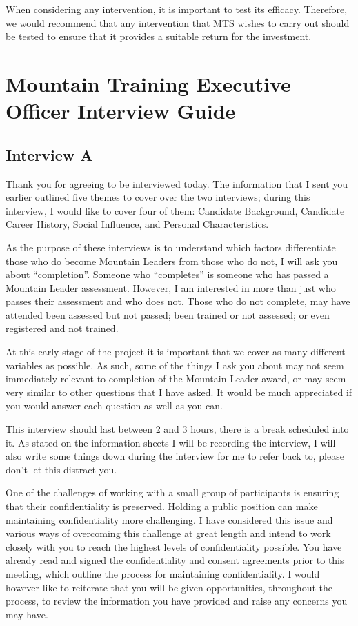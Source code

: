 \documentclass[
  12pt,
  a4paper,
]{book}
\begin{document}
When considering any intervention, it is important to test its efficacy. Therefore, we would recommend that any intervention that MTS wishes to carry out should be tested to ensure that it provides a suitable return for the investment.

\hypertarget{appendix-appendix}{%
\appendix}


\hypertarget{appendix-interview-guide}{%
\chapter{Mountain Training Executive Officer Interview Guide}\label{appendix-interview-guide}}

\hypertarget{interview-a}{%
\section{Interview A}\label{interview-a}}

Thank you for agreeing to be interviewed today. The information that I sent you earlier outlined five themes to cover over the two interviews; during this interview, I would like to cover four of them: Candidate Background, Candidate Career History, Social Influence, and Personal Characteristics.

As the purpose of these interviews is to understand which factors differentiate those who do become Mountain Leaders from those who do not, I will ask you about ``completion''. Someone who ``completes'' is someone who has passed a Mountain Leader assessment. However, I am interested in more than just who passes their assessment and who does not. Those who do not complete, may have attended been assessed but not passed; been trained or not assessed; or even registered and not trained.

At this early stage of the project it is important that we cover as many different variables as possible. As such, some of the things I ask you about may not seem immediately relevant to completion of the Mountain Leader award, or may seem very similar to other questions that I have asked. It would be much appreciated if you would answer each question as well as you can.

This interview should last between 2 and 3 hours, there is a break scheduled into it. As stated on the information sheets I will be recording the interview, I will also write some things down during the interview for me to refer back to, please don't let this distract you.

One of the challenges of working with a small group of participants is ensuring that their confidentiality is preserved. Holding a public position can make maintaining confidentiality more challenging. I have considered this issue and various ways of overcoming this challenge at great length and intend to work closely with you to reach the highest levels of confidentiality possible. You have already read and signed the confidentiality and consent agreements prior to this meeting, which outline the process for maintaining confidentiality. I would however like to reiterate that you will be given opportunities, throughout the process, to review the information you have provided and raise any concerns you may have.
\end{document}
